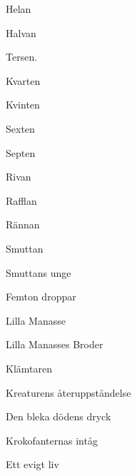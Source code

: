 \vspace{8pt}
\begin{enumerate}[leftmargin=0.65cm,topsep=0pt,itemsep=2pt,partopsep=0pt,parsep=3pt]
  \begin{minipage}{0.45\linewidth} 
  \item Helan
  \item Halvan
  \item Tersen.
  \item Kvarten
  \item Kvinten
  \item Sexten
  \item Septen
  \item Rivan
  \item Rafflan
  \item Rännan
  \end{minipage}
  \begin{minipage}{0.55\linewidth}
  \item Smuttan
  \item Smuttans unge
  \item Femton droppar
  \item Lilla Manasse
  \item Lilla Manasses Broder
  \item Klämtaren
  \item Kreaturens återuppståndelse
  \item Den bleka dödens dryck
  \item Krokofanternas intåg
  \item Ett evigt liv
  \end{minipage}
\end{enumerate}\par
